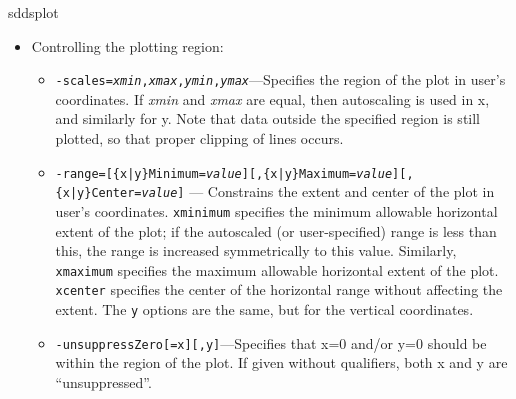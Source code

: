 \begin{sddsprog}{sddsplot}
\begin{itemize}
\begin{itemize}
{\tt linetype} specifies the line type to use for the arrows, using the same mechanism as for lines
in the {\tt -graphic} switch.  The default is 0.

{\tt cartesianData}, {\tt polarData}, and {\tt scalarData} specify the type of data being provided.
For the first two, one must have specified both {\em x1Name} and {\em y1NameList} in the plot
request; for {\tt cartesianData}, x1 and y1 are the x and y vector components, while for {\tt
polarData} x1 is the length and y1 is the angle in radians from the positive x direction.

{\tt centered} specifies that arrows should be centered on the corresponding (x, y) point; by
default, the arrow starts at the (x, y) point.  {\tt singleBarb} specifies that arrows should have
only a single barb, rather than the default two barbs; this can be significantly faster for large
amounts of data.  {\tt barbLength} and {\tt barbAngle} specify the length and angle of arrow barbs;
the barb length is a specified as a fraction of the arrow length, which the barb angle is specified
in degrees.

  \item {\tt -linetypeDefault={\em integer}[,thickness={\em value}]}--- Specifies the default line type for borders, legend
        text, labels, axes, and so on.  If not given, 0 is used.

\end{itemize}

\item Controlling the plotting region:
  \begin{itemize} 

   \item {\tt -scales={\em xmin},{\em xmax},{\em ymin},{\em ymax}}---Specifies the region of the plot in user's
coordinates.  If {\em xmin} and {\em xmax} are equal, then autoscaling is used in x, and similarly for y. Note
that data outside the specified region is still plotted, so that proper clipping of lines occurs.
 
 \item {\tt -range=[\{x|y\}Minimum={\em value}][,\{x|y\}Maximum={\em value}][,\{x|y\}Center={\em value}]}
        --- Constrains the extent
        and center of the plot in user's coordinates.  {\tt xminimum} specifies the minimum allowable
        horizontal extent of the plot; if the autoscaled (or user-specified) range is less than this, the
        range is increased symmetrically to this value.  Similarly, {\tt xmaximum} specifies the maximum
        allowable horizontal extent of the plot.  {\tt xcenter} specifies the center of the horizontal
        range without affecting the extent.  The {\tt y} options are the same, but for the vertical
        coordinates.
  \item {\tt -unsuppressZero[=x][,y]}---Specifies that x=0 and/or y=0 should be within the region of
the plot.  If given without qualifiers, both x and y are ``unsuppressed''.


\end{itemize}
\end{itemize}
\end{sddsprog}

